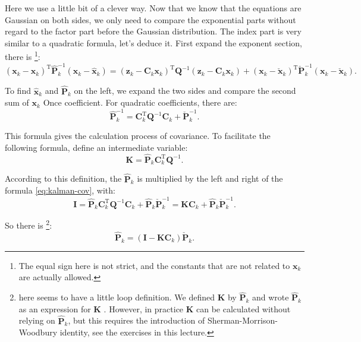 Here we use a little bit of a clever way. Now that we know that the equations are Gaussian on both sides, we only need to compare the exponential parts without regard to the factor part before the Gaussian distribution. The index part is very similar to a quadratic formula, let's deduce it. First expand the exponent section, there is \footnote{The equal sign here is not strict, and the constants that are not related to $\bm{x}_k$ are actually allowed. }:
\begin{equation}
{\left( {{\bm{x}_k} - {{\hat{\bm{x}}}_k}} \right)^\mathrm{T}}\hat{\bm{P}}_k^{ - 1}\left( {{\bm{x}_k} - {{\hat{\bm{x}}}_k}} \right) = {\left( {{\bm{z}_k} - {\bm{C}_k} {\bm{x}_k}} \right)^\mathrm{T}}{\bm{Q}^{ - 1}}\left( {{\bm{z}_k} - {\bm{C}_k}{\bm{x}_k}} \right) + {\left( {{\bm{x}_k} - {{\check{\bm{x}}}_k}} \right)^\mathrm{T}}\check{\bm{P}}_k^{ - 1}\left( {\bm{x}_k - {{\check{\bm{x}}}_k}} \right).
\end{equation}

To find $\hat{\bm{x}}_k$ and $\bm{\hat{P}}_k$ on the left, we expand the two sides and compare the second sum of $\bm{x}_k$ Once coefficient. For quadratic coefficients, there are:
\begin{equation}
\label{eq:kalman-cov}
\hat{\bm{P}}_k^{ - 1} = \bm{C}_k^\mathrm{T}{\bm{Q}^{ - 1}}{\bm{C}_k} + \check {\bm{P}}_k^{ - 1}.
\end{equation}

This formula gives the calculation process of covariance. To facilitate the following formula, define an intermediate variable:
\begin{equation}
\label{eq:kalman-K}
\bm{K} = \bm{\hat{P}}_k \bm{C}_k^\mathrm{T} \bm{Q}^{-1}.
\end{equation}

According to this definition, the $\bm{\hat{P}}_k$ is multiplied by the left and right of the formula \eqref{eq:kalman-cov}, with:
\begin{equation}
\bm{I} = \bm{\hat{P}}_k \bm{C}_k^\mathrm{T} \bm{Q}^{-1} \bm{C}_k + \bm{\hat{P}}_k \bm{\check{P}}_k^{-1} = \bm{K} \bm{C}_k + \bm{\hat{P}}_k \bm{\check{P}}_k^{-1}.
\end{equation}

So there is \footnote{ here seems to have a little loop definition. We defined $\bm{K}$ by $\bm{\hat{P}}_k$ and wrote $\bm{\hat{P}}_k$ as an expression for $\bm{K}$ . However, in practice $\bm{K}$ can be calculated without relying on $\bm{\hat{P}}_k$, but this requires the introduction of Sherman-Morrison-Woodbury identity\cite{Sherman1950}, see the exercises in this lecture. }:
\begin{equation}
\bm{\hat{P}}_k = ( \bm{I} - \bm{K} \bm{C}_k ) \bm{\check{P}}_k.
\end{equation}

